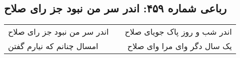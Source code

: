 \begin{center}
\section*{رباعی شماره ۴۵۹: اندر سر من نبود جز رای صلاح}
\label{sec:0459}
\begin{longtable}{l p{0.5cm} r}
اندر سر من نبود جز رای صلاح
&&
اندر شب و روز پاک جویای صلاح
\\
امسال چنانم که نیارم گفتن
&&
یک سال دگر وای مرا وای صلاح
\\
\end{longtable}
\end{center}
